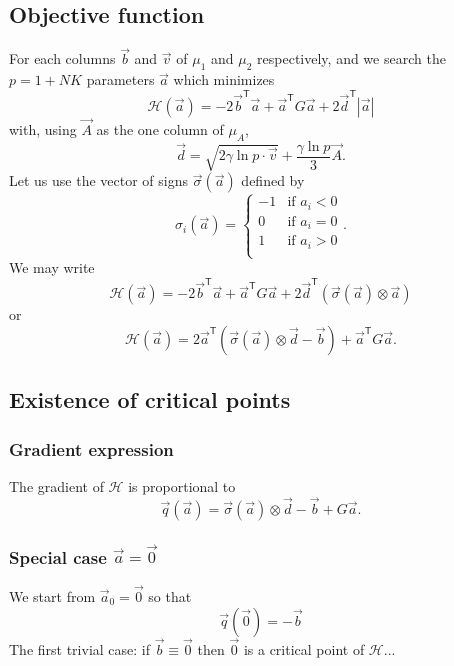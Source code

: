\documentclass{revtex4}
\newcommand{\abs}[1]{\left|#1\right|}
\newcommand{\trn}[1]{{#1}^{\mathsf{T}}}
\begin{document}
\subsection{Objective function}
For each columns $\vec{b}$ and $\vec{v}$ of $\mu_1$ and $\mu_2$ respectively, and we search the $p=1+NK$ parameters $\vec{a}$ which minimizes
\begin{equation}
	\mathcal{H}\left(\vec{a}\right) = -2\trn{\vec{b}}\vec{a} + \trn{\vec{a}} G \vec{a} +2 \trn{\vec{d}} \abs{\vec{a}}
\end{equation}
with, using $\vec{A}$ as the one column of $\mu_A$, 
\begin{equation}
	\vec{d} = \sqrt{2\gamma \ln p \cdot \vec{v}} + \dfrac{\gamma\ln p}{3} \vec{A}. 
\end{equation}
Let us use the vector of signs
$\vec{\sigma}\left(\vec{a}\right)$ defined by
\begin{equation}
	\sigma_{i}\left({\vec{a}}\right) = \left\lbrace
	\begin{array}{rl}
	-1 & \text{if $a_i<0$}\\
	0  & \text{if $a_i=0$}\\
	1  & \text{if $a_i>0$}\\
	\end{array}
	\right.
	.
\end{equation}
We may write
\begin{equation}
	\mathcal{H}\left(\vec{a}\right) = -2\trn{\vec{b}}\vec{a} + \trn{\vec{a}} G \vec{a} + 2 \trn{\vec{d}} \left( \vec{\sigma}\left(\vec{a}\right)\otimes\vec{a} \right)
\end{equation}
or
\begin{equation}
	\mathcal{H}\left(\vec{a}\right) = 2\trn{\vec{a}}\left(\vec{\sigma}\left({\vec{a}}\right)\otimes\vec{d}-\vec{b}\right) +  \trn{\vec{a}} G \vec{a}.
\end{equation}
\subsection{Existence of critical points}
\subsubsection{Gradient expression}
The gradient of
  $\mathcal{H}$  is proportional to
\begin{equation}
	\vec{q}\left(\vec{a}\right) = \vec{\sigma}\left({\vec{a}}\right) \otimes \vec{d} -\vec{b} + G \vec{a}.
\end{equation}
\subsubsection{Special case $\vec{a}=\vec{0}$}
We start from $\vec{a}_0=\vec{0}$ so that
\begin{equation}
	\vec{q}\left(\vec{0}\right)=-\vec{b}
\end{equation}
The first trivial case: if $\vec{b}\equiv\vec{0}$ then $\vec{0}$ is a critical point of $\mathcal{H}$...
\end{document}
